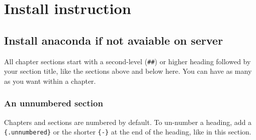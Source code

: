 \documentclass[
]{book}
\begin{document}
\hypertarget{install-instruction}{%
\chapter{Install instruction}\label{install-instruction}}

\hypertarget{install-anaconda-if-not-avaiable-on-server}{%
\section{Install anaconda if not avaiable on server}\label{install-anaconda-if-not-avaiable-on-server}}

All chapter sections start with a second-level (\texttt{\#\#}) or higher heading followed by your section title, like the sections above and below here. You can have as many as you want within a chapter.

\hypertarget{an-unnumbered-section}{%
\subsection*{An unnumbered section}\label{an-unnumbered-section}}

Chapters and sections are numbered by default. To un-number a heading, add a \texttt{\{.unnumbered\}} or the shorter \texttt{\{-\}} at the end of the heading, like in this section.

  
\end{document}
